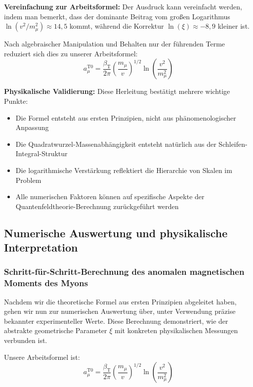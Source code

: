\documentclass[12pt,a4paper]{article}
\newcommand{\betaT}{\beta_{\text{T}}}
\newcommand{\xipar}{\xi}
\begin{document}
	\textbf{Vereinfachung zur Arbeitsformel:} Der Ausdruck kann vereinfacht werden, indem man bemerkt, dass der dominante Beitrag vom großen Logarithmus $\ln(v^2/m_{\mu}^2) \approx 14{,}5$ kommt, während die Korrektur $\ln(\xipar) \approx -8{,}9$ kleiner ist. 
	
	Nach algebraischer Manipulation und Behalten nur der führenden Terme reduziert sich dies zu unserer Arbeitsformel:
	\begin{equation}
		a_{\mu}^{\text{T0}} = \frac{\betaT}{2\pi} \left(\frac{m_{\mu}}{v}\right)^{1/2} \ln\left(\frac{v^2}{m_{\mu}^2}\right)
	\end{equation}
	
	\textbf{Physikalische Validierung:} Diese Herleitung bestätigt mehrere wichtige Punkte:
	\begin{itemize}
		\item Die Formel entsteht aus ersten Prinzipien, nicht aus phänomenologischer Anpassung
		\item Die Quadratwurzel-Massenabhängigkeit entsteht natürlich aus der Schleifen-Integral-Struktur
		\item Die logarithmische Verstärkung reflektiert die Hierarchie von Skalen im Problem
		\item Alle numerischen Faktoren können auf spezifische Aspekte der Quantenfeldtheorie-Berechnung zurückgeführt werden
	\end{itemize}
	
	\subsection{Numerische Auswertung und physikalische Interpretation}
	
	\subsubsection{Schritt-für-Schritt-Berechnung des anomalen magnetischen Moments des Myons}
	
	Nachdem wir die theoretische Formel aus ersten Prinzipien abgeleitet haben, gehen wir nun zur numerischen Auswertung über, unter Verwendung präzise bekannter experimenteller Werte. Diese Berechnung demonstriert, wie der abstrakte geometrische Parameter $\xipar$ mit konkreten physikalischen Messungen verbunden ist.
	
	Unsere Arbeitsformel ist:
	\begin{equation}
		a_{\mu}^{\text{T0}} = \frac{\betaT}{2\pi} \left(\frac{m_{\mu}}{v}\right)^{1/2} \ln\left(\frac{v^2}{m_{\mu}^2}\right)
	\end{equation}
	
\end{document}
